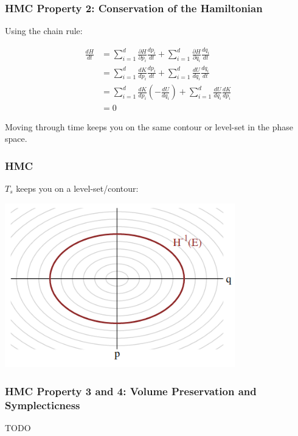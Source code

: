 \documentclass{beamer}
\begin{document}
\begin{frame}
\frametitle{HMC Property 2: Conservation of the Hamiltonian}

Using the chain rule:

\begin{align*}
\frac{d H}{dt} &= \sum_{i=1}^d \frac{\partial H}{\partial p_i}\frac{dp_i}{dt} + \sum_{i=1}^d \frac{\partial H}{\partial q_i}\frac{dq_i}{dt} \\
&= \sum_{i=1}^d \frac{dK}{dp_i}\frac{dp_i}{dt} + \sum_{i=1}^d \frac{dU}{dq_i}\frac{dq_i}{dt} \\
&= \sum_{i=1}^d \frac{dK}{dp_i}\left( - \frac{d U}{dq_i}\right) + \sum_{i=1}^d \frac{dU}{dq_i}\frac{dK}{dp_i} \\
&= 0
\end{align*}

Moving through time keeps you on the same contour or level-set in the phase space.
\end{frame}

\begin{frame}
\frametitle{HMC}

$T_s$ keeps you on a level-set/contour: 
\begin{center}
\includegraphics[width=100mm]{level_sets.png}
\end{center}
\end{frame}

\begin{frame}
\frametitle{HMC Property 3 and 4: Volume Preservation and Symplecticness}

TODO


\end{frame}
\end{document}
